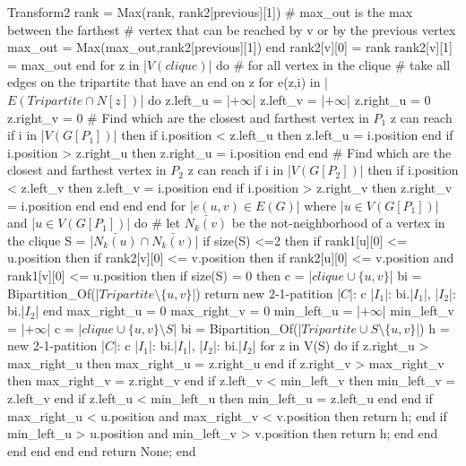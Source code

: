 \begin{code}{Transform2}
      rank = Max(rank, rank2[previous][1])
      # max_out is the max between the farthest
      # vertex that can be reached by v or by the previous vertex
      max_out = Max(max_out,rank2[previous][1])
    end
    rank2[v][0] = rank
    rank2[v][1] = max_out
  end
  for z in |$V(clique)$| do # for all vertex in the clique
    # take all edges on the tripartite that have an end on z
    for e(z,i) in |$E(Tripartite \cap N[z])$| do
      z.left_u = |$+\infty$|
      z.left_v = |$+\infty$|
      z.right_u = 0
      z.right_v = 0
      # Find which are the closest and farthest vertex in $P_1$ z can reach
      if i in |$V(G[P_1])$| then
        if i.position < z.left_u then
          z.left_u = i.position
        end
        if i.position > z.right_u then
          z.right_u = i.position
        end
      end
      # Find which are the closest and farthest vertex in $P_2$ z can reach
      if i in |$V(G[P_2])$| then
        if i.position < z.left_v then
          z.left_v = i.position
        end
        if i.position > z.right_v then
          z.right_v = i.position
        end
      end
    end
  end
  for |$e(u,v) \in E(G)$| where |$u \in V(G[P_1])$| and |$u \in V(G[P_1])$| do
    # let $\bar{N_k(v)}$ be the not-neighborhood of a vertex in the clique
    S = |$\bar{N_k(u)} \cap \bar{N_k(v)}$|
    if size(S) <=2 then
     if rank1[u][0] <= u.position then
       if rank2[v][0] <= v.position then
         if rank2[u][0] <= v.position and rank1[v][0] <= u.position then
           if size(S) = 0 then
             c = |$clique \cup \{u,v\}$|
             bi = Bipartition_Of(|$Tripartite \setminus \{u,v\}$|)
             return new 2-1-patition{
               |$C$|: c
               |$I_1$|: bi.|$I_1$|,
               |$I_2$|: bi.|$I_2$|
             }
           end
           max_right_u = 0
           max_right_v = 0
           min_left_u = |$+\infty$|
           min_left_v = |$+\infty$|
           c = |$clique \cup \{u,v\} \setminus S$|
           bi = Bipartition_Of(|$Tripartite \cup S \setminus \{u,v\}$|)
           h = new 2-1-patition{
               |$C$|: c
               |$I_1$|: bi.|$I_1$|,
               |$I_2$|: bi.|$I_2$|
             }
           for z in V(S) do
            if z.right_u > max_right_u then
              max_right_u = z.right_u
            end
            if z.right_v > max_right_v then
              max_right_v = z.right_v
            end
            if z.left_v < min_left_v then
              min_left_v = z.left_v
            end
            if z.left_u < min_left_u then
              min_left_u = z.left_u
            end
           end
           if max_right_u < u.position and max_right_v < v.position then
             return h;
           end
           if min_left_u > u.position and min_left_v > v.position then
             return h;
           end
         end
       end
     end
    end
  end
  return None;
end
\end{code}


